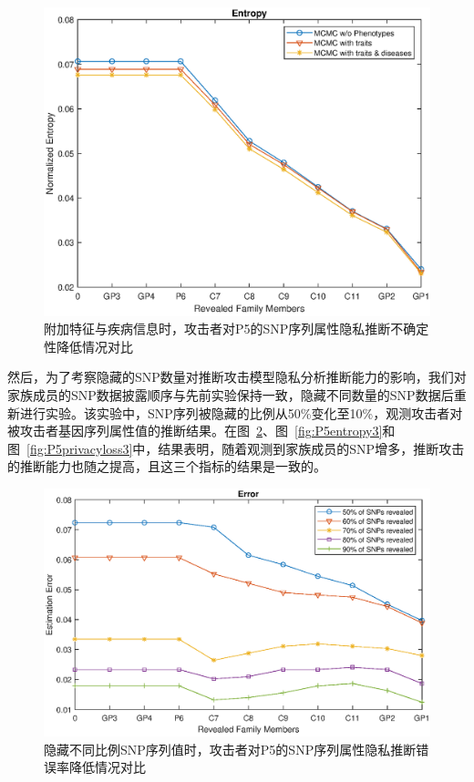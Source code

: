 \begin{figure}[htbp]
	\centering
	\includegraphics[width=0.8\linewidth]{./figures/P5entropy2.eps}
	\centering
	\caption{附加特征与疾病信息时，攻击者对P5的SNP序列属性隐私推断不确定性降低情况对比}\label{fig:P5entropy2}
\end{figure}


然后，为了考察隐藏的SNP数量对推断攻击模型隐私分析推断能力的影响，我们对家族成员的SNP数据披露顺序与先前实验保持一致，隐藏不同数量的SNP数据后重新进行实验。该实验中，SNP序列被隐藏的比例从50\%变化至10\%，观测攻击者对被攻击者基因序列属性值的推断结果。在图~\ref{fig:P5error3}、图~\ref{fig:P5entropy3}和图~\ref{fig:P5privacyloss3}中，结果表明，随着观测到家族成员的SNP增多，推断攻击的推断能力也随之提高，且这三个指标的结果是一致的。

\begin{figure}[htbp]
	\centering
	\includegraphics[width=0.8\linewidth]{./figures/P5error3.eps}
	\centering
	\caption{隐藏不同比例SNP序列值时，攻击者对P5的SNP序列属性隐私推断错误率降低情况对比}\label{fig:P5error3}
\end{figure}


